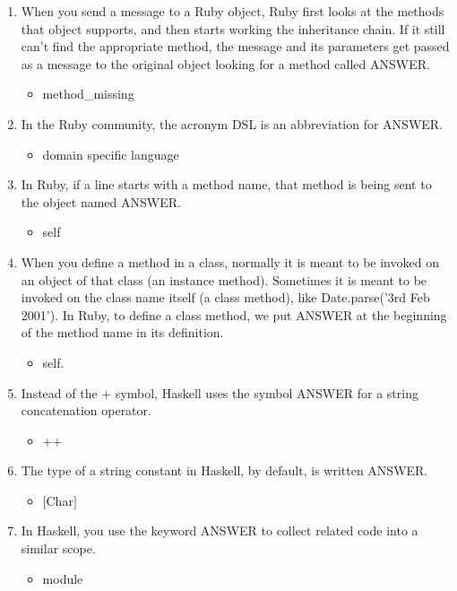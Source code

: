 \documentclass{exam}
\begin{document}
\begin{enumerate}
\begin{itemize}
\end{itemize}
\item When you send a message to a Ruby object, Ruby first looks at the methods that object supports, and then starts working the inheritance chain.  If it still can't find the appropriate method, the message and its parameters get passed as a message to the original object looking for a method called ANSWER.
\begin{itemize}
\item method\_missing
\end{itemize}
\item In the Ruby community, the acronym DSL is an abbreviation for ANSWER.
\begin{itemize}
\item domain specific language
\end{itemize}
\item In Ruby, if a line starts with a method name, that method is being sent to the object named ANSWER.
\begin{itemize}
\item self
\end{itemize}
\item When you define a method in a class, normally it is meant to be invoked on an object of that class (an instance method).  Sometimes it is meant to be invoked on the class name itself (a class method), like Date.parse('3rd Feb 2001').  In Ruby, to define a class method, we put ANSWER at the beginning of the method name in its definition.
\begin{itemize}
\item self.
\end{itemize}
\item Instead of the +  symbol, Haskell uses the symbol ANSWER for a string concatenation operator.
\begin{itemize}
\item ++
\end{itemize}
\item The type of a string constant in Haskell, by default, is written ANSWER.
\begin{itemize}
\item $\lbrack$Char$\rbrack$
\end{itemize}
\item In Haskell, you use the keyword ANSWER to collect related code into a similar scope.
\begin{itemize}
\item module
\end{itemize}

\end{enumerate}
\end{document}

